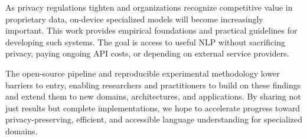 As privacy regulations tighten and organizations recognize competitive value in proprietary data, on-device specialized models will become increasingly important. This work provides empirical foundations and practical guidelines for developing such systems. The goal is access to useful NLP without sacrificing privacy, paying ongoing API costs, or depending on external service providers.

The open-source pipeline and reproducible experimental methodology lower barriers to entry, enabling researchers and practitioners to build on these findings and extend them to new domains, architectures, and applications. By sharing not just results but complete implementations, we hope to accelerate progress toward privacy-preserving, efficient, and accessible language understanding for specialized domains.
